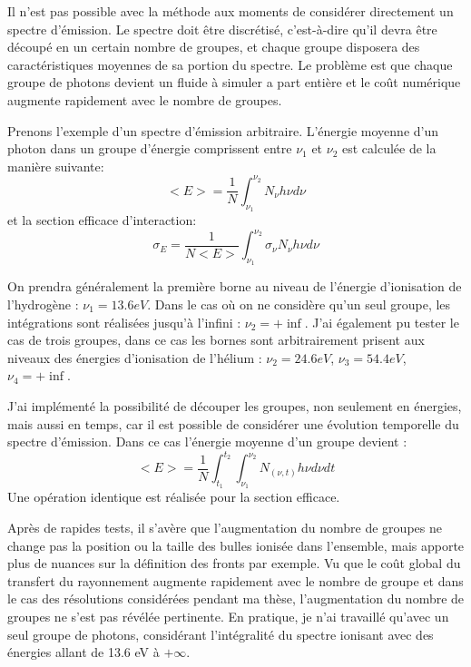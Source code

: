 Il n'est pas possible avec la méthode aux moments de considérer directement un spectre d'émission.
Le spectre doit être discrétisé, c'est-à-dire qu'il devra être découpé en un certain nombre de groupes, et chaque groupe disposera des caractéristiques moyennes de sa portion du spectre.
Le problème est que chaque groupe de photons devient un fluide à simuler a part entière et le coût numérique augmente rapidement avec le nombre de groupes. 

Prenons l'exemple d'un spectre d'émission arbitraire.
L’énergie moyenne d'un photon dans un groupe d'énergie comprissent entre $\nu_1$ et $\nu_2$ est calculée de la manière suivante:
\begin{equation}
<E> = \frac{1}{N} \int_{\nu_1}^{\nu_2} N_\nu h \nu d\nu
\end{equation}
et la section efficace d'interaction:
\begin{equation}
\sigma_E = \frac{1}{N<E>} \int_{\nu_1}^{\nu_2} \sigma_\nu N_\nu h \nu d\nu
\end{equation}

On prendra généralement la première borne au niveau de l'énergie d'ionisation de l'hydrogène : $\nu_1=13.6eV$.
Dans le cas où on ne considère qu'un seul groupe, les intégrations sont réalisées jusqu'à l'infini : $\nu_2= + \inf$.
J'ai également pu tester le cas de trois groupes, dans ce cas les bornes sont arbitrairement prisent aux niveaux des énergies d'ionisation de l'hélium : 
$\nu_2= 24.6 eV$, $\nu_3= 54.4 eV $, $\nu_4= + \inf$.

J'ai implémenté la possibilité de découper les groupes, non seulement en énergies, mais aussi en temps, car il est possible de considérer une évolution temporelle du spectre d'émission.
Dans ce cas l'énergie moyenne d'un groupe devient : 
\begin{equation}
<E> = \frac{1}{N}  \int_{t_1}^{t_2}  \int_{\nu_1}^{\nu_2} N_{(\nu,t)} h \nu d\nu dt
\end{equation}
Une opération identique est réalisée pour la section efficace.

Après de rapides tests, il s'avère que l'augmentation du nombre de groupes ne change pas la position ou la taille des bulles ionisée dans l'ensemble, mais apporte plus de nuances sur la définition des fronts par exemple.
Vu que le coût global du transfert du rayonnement augmente rapidement avec le nombre de groupe et dans le cas des résolutions considérées pendant ma thèse, l'augmentation du nombre de groupes ne s'est pas révélée pertinente.
En pratique, je n'ai travaillé qu'avec un seul groupe de photons, considérant l'intégralité du spectre ionisant avec des énergies allant de 13.6 eV à $+\infty$.

